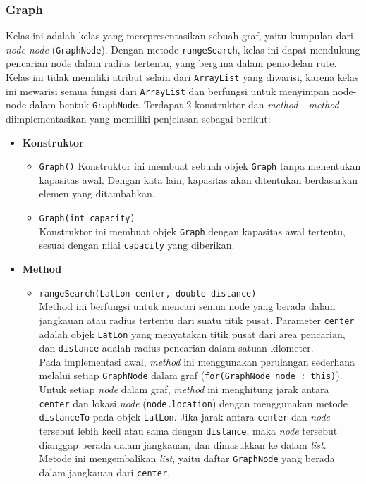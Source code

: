 \subsubsection{Graph}
\label{subss:graph}
Kelas ini adalah kelas yang merepresentasikan sebuah graf, yaitu kumpulan dari \textit{node-node} (\texttt{GraphNode}). Dengan metode \texttt{rangeSearch}, kelas ini dapat mendukung pencarian node dalam radius tertentu, yang berguna dalam pemodelan rute. Kelas ini tidak memiliki atribut selain dari \texttt{ArrayList} yang diwarisi, karena kelas ini mewarisi semua fungsi dari \texttt{ArrayList} dan berfungsi untuk menyimpan node-node dalam bentuk \texttt{GraphNode}. Terdapat 2 konstruktor dan \textit{method - method} diimplementasikan yang memiliki penjelasan sebagai berikut:
\begin{itemize}
    \item \textbf{Konstruktor}
    \begin{itemize}
        \item \texttt{Graph()}
        Konstruktor ini membuat sebuah objek \texttt{Graph} tanpa menentukan kapasitas awal. Dengan kata lain, kapasitas akan ditentukan berdasarkan elemen yang ditambahkan.
        \item \texttt{Graph(int capacity)}
        \\ Konstruktor ini membuat objek \texttt{Graph} dengan kapasitas awal tertentu, sesuai dengan nilai \texttt{capacity} yang diberikan.
    \end{itemize}

    \item \textbf{Method}
    \begin{itemize}
        \item \texttt{rangeSearch(LatLon center, double distance)}
        \\ Method ini berfungsi untuk mencari semua node yang berada dalam jangkauan atau radius tertentu dari suatu titik pusat. Parameter \texttt{center} adalah objek \texttt{LatLon} yang menyatakan titik pusat dari area pencarian, dan \texttt{distance} adalah radius pencarian dalam satuan kilometer.
        \\ Pada implementasi awal, \textit{method} ini menggunakan perulangan sederhana melalui setiap \texttt{GraphNode} dalam graf (\texttt{for(GraphNode node : this)}). Untuk setiap \textit{node} dalam graf, \textit{method} ini menghitung jarak antara \texttt{center} dan lokasi \textit{node} (\texttt{node.location}) dengan menggunakan metode \texttt{distanceTo} pada objek \texttt{LatLon}. Jika jarak antara \texttt{center} dan \textit{node} tersebut lebih kecil atau sama dengan \texttt{distance}, maka \textit{node} tersebut dianggap berada dalam jangkauan, dan dimasukkan ke dalam \textit{list}. Metode ini mengembalikan \textit{list}, yaitu daftar \texttt{GraphNode} yang berada dalam jangkauan dari \texttt{center}.
    \end{itemize}
\end{itemize}

